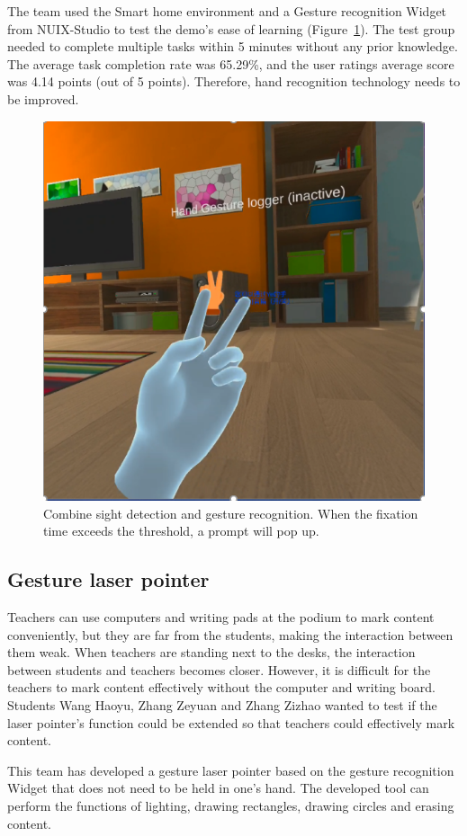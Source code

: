 The team used the Smart home environment and a Gesture recognition Widget from NUIX-Studio to test the demo's ease of learning (Figure~\ref{fig:Project7-figure}). The test group needed to complete multiple tasks within 5 minutes without any prior knowledge. The average task completion rate was 65.29\%, and the user ratings average score was 4.14 points (out of 5 points). Therefore, hand recognition technology needs to be improved.

\begin{figure}
  \centering
  \includegraphics[width=0.6\linewidth]{figures/Project_7.png}
  \caption{Combine sight detection and gesture recognition. When the fixation time exceeds the threshold, a prompt will pop up.}
  \label{fig:Project7-figure}
\end{figure}

\subsection{Gesture laser pointer}
Teachers can use computers and writing pads at the podium to mark content conveniently, but they are far from the students, making the interaction between them weak. When teachers are standing next to the desks, the interaction between students and teachers becomes closer. However, it is difficult for the teachers to mark content effectively without the computer and writing board. Students Wang Haoyu, Zhang Zeyuan and Zhang Zizhao wanted to test if the laser pointer's function could be extended so that teachers could effectively mark content.

This team has developed a gesture laser pointer based on the gesture recognition Widget that does not need to be held in one's hand.
The developed tool can perform the functions of lighting, drawing rectangles, drawing circles and erasing content.

